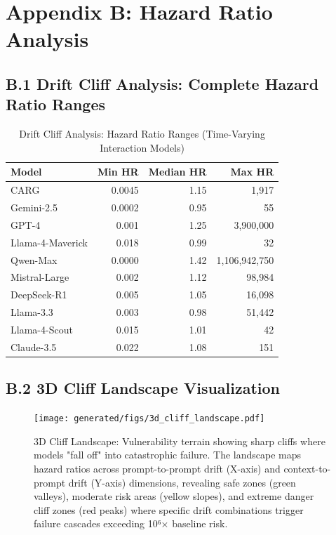 \documentclass[letterpaper]{article}
\begin{document}
\section*{Appendix B: Hazard Ratio Analysis}
\label{app:hazard_analysis}

\subsection*{B.1 Drift Cliff Analysis: Complete Hazard Ratio Ranges}

\begin{table}[ht]
\centering
\caption{Drift Cliff Analysis: Hazard Ratio Ranges (Time-Varying Interaction Models)}
\label{tab:drift_cliff_detailed}
\begin{tabular}{lrrr}
\toprule
\textbf{Model} & \textbf{Min HR} & \textbf{Median HR} & \textbf{Max HR} \\
\midrule
CARG & 0.0045 & 1.15 & 1,917 \\
Gemini-2.5 & 0.0002 & 0.95 & 55 \\
GPT-4 & 0.001 & 1.25 & 3,900,000 \\
Llama-4-Maverick & 0.018 & 0.99 & 32 \\
Qwen-Max & 0.0000 & 1.42 & 1,106,942,750 \\
Mistral-Large & 0.002 & 1.12 & 98,984 \\
DeepSeek-R1 & 0.005 & 1.05 & 16,098 \\
Llama-3.3 & 0.003 & 0.98 & 51,442 \\
Llama-4-Scout & 0.015 & 1.01 & 42 \\
Claude-3.5 & 0.022 & 1.08 & 151 \\
\bottomrule
\end{tabular}
\end{table}

\subsection*{B.2 3D Cliff Landscape Visualization}

\begin{figure}[ht]
\centering
\texttt{[image: generated/figs/3d\_cliff\_landscape.pdf]}
\caption{3D Cliff Landscape: Vulnerability terrain showing sharp cliffs where models "fall off" into catastrophic failure. The landscape maps hazard ratios across prompt-to-prompt drift (X-axis) and context-to-prompt drift (Y-axis) dimensions, revealing safe zones (green valleys), moderate risk areas (yellow slopes), and extreme danger cliff zones (red peaks) where specific drift combinations trigger failure cascades exceeding 10⁶× baseline risk.}
\label{fig:3d_cliff_landscape}
\end{figure}
\end{document}

